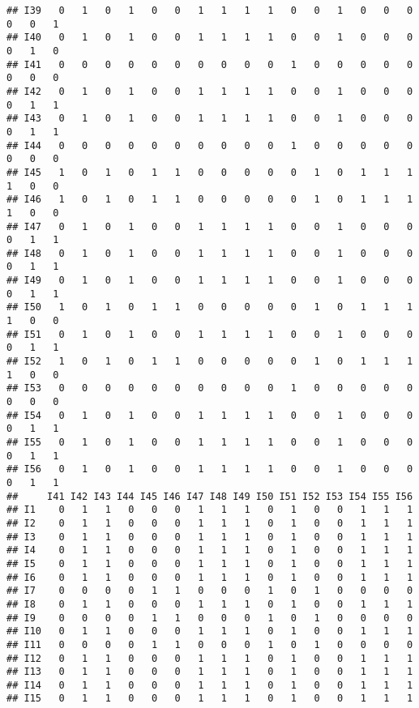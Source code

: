\documentclass[
]{article}
\begin{document}
\begin{verbatim}
## I39   0   1   0   1   0   0   1   1   1   1   0   0   1   0   0   0   0   0   1
## I40   0   1   0   1   0   0   1   1   1   1   0   0   1   0   0   0   0   1   0
## I41   0   0   0   0   0   0   0   0   0   0   1   0   0   0   0   0   0   0   0
## I42   0   1   0   1   0   0   1   1   1   1   0   0   1   0   0   0   0   1   1
## I43   0   1   0   1   0   0   1   1   1   1   0   0   1   0   0   0   0   1   1
## I44   0   0   0   0   0   0   0   0   0   0   1   0   0   0   0   0   0   0   0
## I45   1   0   1   0   1   1   0   0   0   0   0   1   0   1   1   1   1   0   0
## I46   1   0   1   0   1   1   0   0   0   0   0   1   0   1   1   1   1   0   0
## I47   0   1   0   1   0   0   1   1   1   1   0   0   1   0   0   0   0   1   1
## I48   0   1   0   1   0   0   1   1   1   1   0   0   1   0   0   0   0   1   1
## I49   0   1   0   1   0   0   1   1   1   1   0   0   1   0   0   0   0   1   1
## I50   1   0   1   0   1   1   0   0   0   0   0   1   0   1   1   1   1   0   0
## I51   0   1   0   1   0   0   1   1   1   1   0   0   1   0   0   0   0   1   1
## I52   1   0   1   0   1   1   0   0   0   0   0   1   0   1   1   1   1   0   0
## I53   0   0   0   0   0   0   0   0   0   0   1   0   0   0   0   0   0   0   0
## I54   0   1   0   1   0   0   1   1   1   1   0   0   1   0   0   0   0   1   1
## I55   0   1   0   1   0   0   1   1   1   1   0   0   1   0   0   0   0   1   1
## I56   0   1   0   1   0   0   1   1   1   1   0   0   1   0   0   0   0   1   1
##     I41 I42 I43 I44 I45 I46 I47 I48 I49 I50 I51 I52 I53 I54 I55 I56
## I1    0   1   1   0   0   0   1   1   1   0   1   0   0   1   1   1
## I2    0   1   1   0   0   0   1   1   1   0   1   0   0   1   1   1
## I3    0   1   1   0   0   0   1   1   1   0   1   0   0   1   1   1
## I4    0   1   1   0   0   0   1   1   1   0   1   0   0   1   1   1
## I5    0   1   1   0   0   0   1   1   1   0   1   0   0   1   1   1
## I6    0   1   1   0   0   0   1   1   1   0   1   0   0   1   1   1
## I7    0   0   0   0   1   1   0   0   0   1   0   1   0   0   0   0
## I8    0   1   1   0   0   0   1   1   1   0   1   0   0   1   1   1
## I9    0   0   0   0   1   1   0   0   0   1   0   1   0   0   0   0
## I10   0   1   1   0   0   0   1   1   1   0   1   0   0   1   1   1
## I11   0   0   0   0   1   1   0   0   0   1   0   1   0   0   0   0
## I12   0   1   1   0   0   0   1   1   1   0   1   0   0   1   1   1
## I13   0   1   1   0   0   0   1   1   1   0   1   0   0   1   1   1
## I14   0   1   1   0   0   0   1   1   1   0   1   0   0   1   1   1
## I15   0   1   1   0   0   0   1   1   1   0   1   0   0   1   1   1

\end{verbatim}
\end{document}
